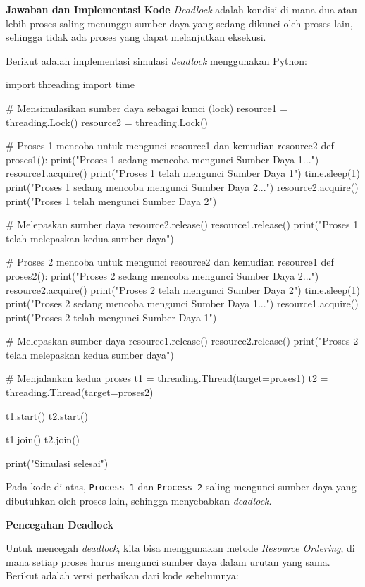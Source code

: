 \documentclass[12pt]{article}
\begin{document}
\textbf{Jawaban dan Implementasi Kode}
\vspace{0.5cm}
\textit{Deadlock} adalah kondisi di mana dua atau lebih proses saling menunggu sumber daya yang sedang dikunci oleh proses lain, sehingga tidak ada proses yang dapat melanjutkan eksekusi.

Berikut adalah implementasi simulasi \textit{deadlock} menggunakan Python:

\begin{python}  
import threading
import time

# Mensimulasikan sumber daya sebagai kunci (lock)
resource1 = threading.Lock()
resource2 = threading.Lock()

# Proses 1 mencoba untuk mengunci resource1 dan kemudian resource2
def proses1():
    print("Proses 1 sedang mencoba mengunci Sumber Daya 1...")
    resource1.acquire()
    print("Proses 1 telah mengunci Sumber Daya 1")
    time.sleep(1)
    print("Proses 1 sedang mencoba mengunci Sumber Daya 2...")
    resource2.acquire()
    print("Proses 1 telah mengunci Sumber Daya 2")
    
    # Melepaskan sumber daya
    resource2.release()
    resource1.release()
    print("Proses 1 telah melepaskan kedua sumber daya")

# Proses 2 mencoba untuk mengunci resource2 dan kemudian resource1
def proses2():
    print("Proses 2 sedang mencoba mengunci Sumber Daya 2...")
    resource2.acquire()
    print("Proses 2 telah mengunci Sumber Daya 2")
    time.sleep(1)
    print("Proses 2 sedang mencoba mengunci Sumber Daya 1...")
    resource1.acquire()
    print("Proses 2 telah mengunci Sumber Daya 1")
    
    # Melepaskan sumber daya
    resource1.release()
    resource2.release()
    print("Proses 2 telah melepaskan kedua sumber daya")

# Menjalankan kedua proses
t1 = threading.Thread(target=proses1)
t2 = threading.Thread(target=proses2)

t1.start()
t2.start()

t1.join()
t2.join()

print("Simulasi selesai")
\end{python}

Pada kode di atas, \texttt{Process 1} dan \texttt{Process 2} saling mengunci sumber daya yang dibutuhkan oleh proses lain, sehingga menyebabkan \textit{deadlock}.

\textbf{Pencegahan Deadlock}

Untuk mencegah \textit{deadlock}, kita bisa menggunakan metode \textit{Resource Ordering}, di mana setiap proses harus mengunci sumber daya dalam urutan yang sama. Berikut adalah versi perbaikan dari kode sebelumnya:
\end{document}
